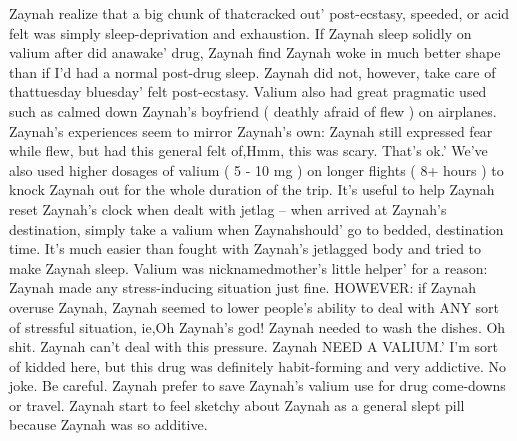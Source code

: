 \documentclass[12pt]{book}
\begin{document}
Zaynah realize that a big chunk of thatcracked out' post-ecstasy, speeded, or acid felt was simply sleep-deprivation and exhaustion. If Zaynah sleep solidly on valium after did anawake' drug, Zaynah find Zaynah woke in much better shape than if I'd had a normal post-drug sleep. Zaynah did not, however, take care of thattuesday bluesday' felt post-ecstasy. Valium also had great pragmatic used such as calmed down Zaynah's boyfriend ( deathly afraid of flew ) on airplanes. Zaynah's experiences seem to mirror Zaynah's own: Zaynah still expressed fear while flew, but had this general felt of,Hmm, this was scary. That's ok.' We've also used higher dosages of valium ( 5 - 10 mg ) on longer flights ( 8+ hours ) to knock Zaynah out for the whole duration of the trip. It's useful to help Zaynah reset Zaynah's clock when dealt with jetlag -- when arrived at Zaynah's destination, simply take a valium when Zaynahshould' go to bedded, destination time. It's much easier than fought with Zaynah's jetlagged body and tried to make Zaynah sleep. Valium was nicknamedmother's little helper' for a reason: Zaynah made any stress-inducing situation just fine. HOWEVER: if Zaynah overuse Zaynah, Zaynah seemed to lower people's ability to deal with ANY sort of stressful situation, ie,Oh Zaynah's god! Zaynah needed to wash the dishes. Oh shit. Zaynah can't deal with this pressure. Zaynah NEED A VALIUM.' I'm sort of kidded here, but this drug was definitely habit-forming and very addictive. No joke. Be careful. Zaynah prefer to save Zaynah's valium use for drug come-downs or travel. Zaynah start to feel sketchy about Zaynah as a general slept pill because Zaynah was so additive.
\end{document}
